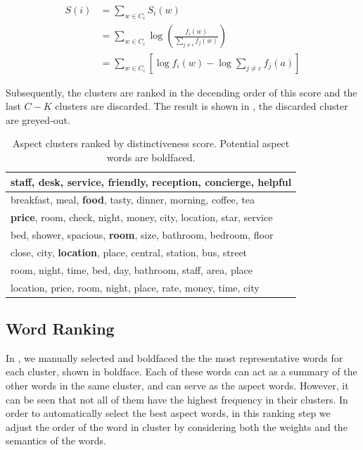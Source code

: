 \begin{align}
S(i) &= \sum_{w\in C_i} S_i(w) \nonumber\\ 
     &= \sum_{w\in C_i} \log\left(\frac{f_i(w)}{\sum_{j\neq i} f_j(w)}\right)\nonumber \\
     &= \sum_{w\in C_i}\left[\log f_i(w) - \log\sum_{j\neq c} f_j(a)\right]
\end{align}

Subsequently, the clusters are ranked in the decending order of 
this score and the last $C-K$ clusters are discarded.
The result is shown in , the discarded cluster are greyed-out.

\begin{table}[t]
\caption{Aspect clusters ranked by distinctiveness score.
Potential aspect words are boldfaced.}
\label{table:clustersranked}
\centering
\begin{tabular}{|l|} \hline
\textbf{staff}, desk, \textbf{service}, friendly, reception, concierge, helpful \\\hline
breakfast, meal, \textbf{food}, tasty, dinner, morning, coffee, tea \\\hline
\textbf{price}, room, check, night, money, city, location, star, service \\\hline
bed, shower, spacious, \textbf{room}, size, bathroom, bedroom, floor \\\hline
close, city, \textbf{location}, place, central, station, bus, street \\\hline
\textcolor{mygray}{room, night, time, bed, day, bathroom, staff, area, place} \\\hline
\textcolor{mygray}{location, price, room, night, place, rate, money, time, city} \\\hline
\end{tabular}
\end{table}

\subsection{Word Ranking}
\label{sec:word_ranking}


In ,
we manually selected and boldfaced the the most representative words for
each cluster, shown in boldface.  
Each of these words can act as a summary of the 
other words in the same cluster, and can serve as the aspect words.
However, it can be seen that not all of them have the highest frequency 
in their clusters.  In order to 
automatically select the best aspect words,
in this ranking step we adjust the order of the word in cluster 
by considering both the weights and the semantics of the words.

